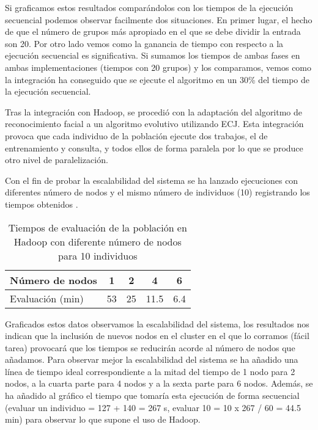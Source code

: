 Si graficamos estos resultados  compar\'andolos con los tiempos de la ejecuci\'on secuencial podemos observar facilmente dos situaciones. En primer lugar, el hecho de que el n\'umero de grupos m\'as apropiado en el que se debe dividir la entrada son 20. Por otro lado vemos como la ganancia de tiempo con respecto a la ejecuci\'on secuencial es significativa. Si sumamos los tiempos de ambas fases en ambas implementaciones (tiempos con 20 grupos) y los comparamos, vemos como la integraci\'on ha conseguido que se ejecute el algoritmo en un 30\% del tiempo de la ejecuci\'on secuencial.


Tras la integraci\'on con Hadoop, se procedi\'o con la adaptaci\'on del algoritmo de reconocimiento facial a un algoritmo evolutivo utilizando ECJ. Esta integraci\'on provoca que cada individuo de la poblaci\'on ejecute dos trabajos, el de entrenamiento y consulta, y todos ellos de forma paralela por lo que se produce otro nivel de paralelizaci\'on. 

Con el fin de probar la escalabilidad del sistema se ha lanzado ejecuciones con diferentes n\'umero de nodos y el mismo n\'umero de individuos (10) registrando los tiempos obtenidos .

\begin{table}[H]
  \begin{center}
    \begin{center}
    \begin{tabular}{l | c c c c}
    N\'umero de nodos & 1 & 2 & 4 & 6 \\ \hline
    Evaluaci\'on (min) & 53 & 25 & 11.5 & 6.4\\
    \end{tabular}
    \end{center}
    \caption{Tiempos de evaluaci\'on de la poblaci\'on en Hadoop con diferente n\'umero de nodos para 10 individuos}
    \label{tabla-dif-num-nodos}
  \end{center}
\end{table}


Graficados estos datos  observamos la escalabilidad del sistema, los resultados nos indican que la inclusi\'on de nuevos nodos en el cluster en el que lo corramos (f\'acil tarea) provocar\'a que los tiempos se reducir\'an acorde al n\'umero de nodos que a\~nadamos. Para observar mejor la escalabilidad del sistema se ha a\~nadido una l\'inea de tiempo ideal correspondiente a la mitad del tiempo de 1 nodo para 2 nodos, a la cuarta parte para 4 nodos y a la sexta parte para 6 nodos. Adem\'as, se ha a\~nadido al gr\'afico el tiempo que tomar\'ia esta ejecuci\'on de forma secuencial (evaluar un individuo {= 127 + 140 = 267 s}, evaluar 10 {= 10 x 267 / 60 = 44.5 min}) para observar lo que supone el uso de Hadoop.


